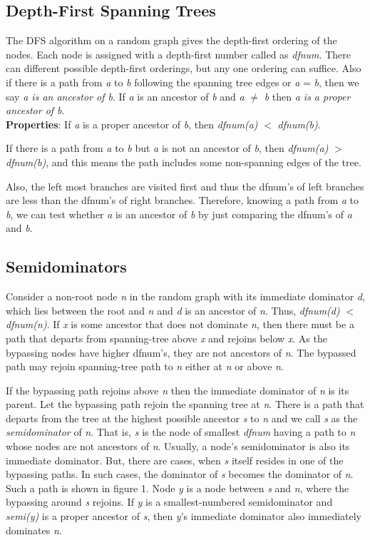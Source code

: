 \documentclass[10pt, oneside, a4paper]{article}
\begin{document}
\subsection{Depth-First Spanning Trees}
The DFS algorithm on a random graph gives the depth-first ordering of the nodes.  Each node is assigned with a depth-first number called as \emph{dfnum}.  There can different possible depth-first orderings, but any one ordering can suffice.  Also if there is a path from \emph{a} to \emph{b} following the spanning tree edges or \emph{a} = \emph{b}, then we say \emph{a is an ancestor of b}.  If \emph{a} is an ancestor of \emph{b} and \emph{a} $\neq$ \emph{b} then \emph{a is a proper ancestor of b}.\\
\textbf{Properties}: If \emph{a} is a proper ancestor of \emph{b}, then \emph{dfnum(a)} $<$ \emph{dfnum(b)}.

If there is a path from \emph{a} to \emph{b} but \emph{a} is not an ancestor of \emph{b}, then \emph{dfnum(a)} $>$ \emph{dfnum(b)}, and this means the path includes some non-spanning edges of the tree.

Also, the left most branches are visited first and thus the dfnum's of left branches are less than the dfnum's of right branches.  Therefore, knowing a path from \emph{a} to \emph{b}, we can test whether \emph{a} is an ancestor of \emph{b} by just comparing the dfnum's of \emph{a} and \emph{b}.

\subsection{Semidominators}
Consider a non-root node \emph{n} in the random graph with its immediate dominator \emph{d}, which lies between the root and \emph{n} and \emph{d} is an ancestor of \emph{n}.  Thus, \emph{dfnum(d)} $<$ \emph{dfnum(n)}.  If \emph{x} is some ancestor that does not dominate \emph{n}, then there must be a path that departs from spanning-tree above \emph{x} and rejoins below \emph{x}.  As the bypassing nodes have higher dfnum's, they are not ancestors of \emph{n}.  The bypassed path may rejoin spanning-tree path to \emph{n} either at \emph{n} or above \emph{n}.

If the bypassing path rejoins above \emph{n} then the immediate dominator of \emph{n} is its parent.  Let the bypassing path rejoin the spanning tree at \emph{n}.  There is a path that departs from the tree at the highest possible ancestor \emph{s} to \emph{n} and we call \emph{s} as the \emph{semidominator} of \emph{n}.  That is, \emph{s} is the node of smallest \emph{dfnum} having a path to \emph{n} whose nodes are not ancestors of \emph{n}.  Usually, a node's semidominator is also its immediate dominator.  But, there are cases, when \emph{s} itself resides in one of the bypassing paths.  In such cases, the dominator of \emph{s} becomes the dominator of \emph{n}.  Such a path is shown in figure 1.  Node \emph{y} is a node between \emph{s} and \emph{n}, where the bypassing around \emph{s} rejoins.  If \emph{y} is a smallest-numbered semidominator and \emph{semi(y)} is a proper ancestor of \emph{s}, then \emph{y}'s immediate dominator also immediately dominates \emph{n}.
\end{document}
